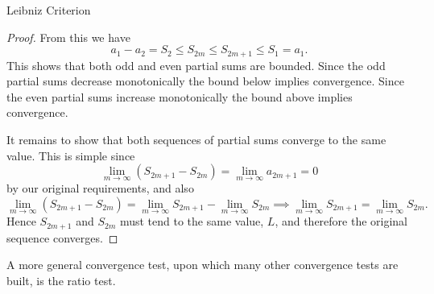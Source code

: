 \documentclass[fleqn]{NotesClass}
\begin{document}
\begin{lma}{Leibniz Criterion}{}
\begin{proof}
            From this we have
            \begin{equation}
                a_1 - a_2 = S_2 \le S_{2m} \le S_{2m+1} \le S_1 = a_1.
            \end{equation}
            This shows that both odd and even partial sums are bounded.
            Since the odd partial sums decrease monotonically the bound below implies convergence.
            Since the even partial sums increase monotonically the bound above implies convergence.
            
            It remains to show that both sequences of partial sums converge to the same value.
            This is simple since
            \begin{equation}
                \lim_{m\to\infty} (S_{2m+1} - S_{2m}) = \lim_{m\to\infty} a_{2m+1} = 0
            \end{equation}
            by our original requirements, and also
            \begin{equation}
                \lim_{m\to\infty} (S_{2m+1} - S_{2m}) = \lim_{m\to\infty} S_{2m+1} - \lim_{m\to\infty} S_{2m} \implies \lim_{m\to\infty} S_{2m+1} = \lim_{m\to\infty} S_{2m}.
            \end{equation}
            Hence \(S_{2m+1}\) and \(S_{2m}\) must tend to the same value, \(L\), and therefore the original sequence converges.
        \end{proof}
    \end{lma}
    
    A more general convergence test, upon which many other convergence tests are built, is the ratio test.
    
\end{document}
